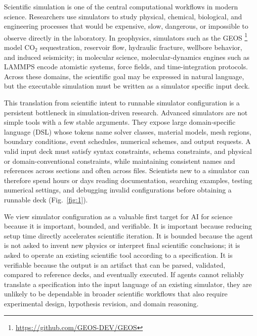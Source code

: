 \documentclass{article}
\begin{document}
Scientific simulation is one of the central computational workflows in modern science. Researchers use simulators to study physical, chemical, biological, and engineering processes that would be expensive, slow, dangerous, or impossible to observe directly in the laboratory. In geophysics, simulators such as the GEOS \footnote{\url{https://github.com/GEOS-DEV/GEOS}}~\citep{geos2024} model CO$_2$ sequestration, reservoir flow, hydraulic fracture, wellbore behavior, and induced seismicity; in molecular science, molecular-dynamics engines such as LAMMPS \citep{holbrook2026lammps} encode atomistic systems, force fields, and time-integration protocols. Across these domains, the scientific goal may be expressed in natural language, but the executable simulation must be written as a simulator specific input deck.

This translation from scientific intent to runnable simulator configuration is a persistent bottleneck in simulation-driven research. Advanced simulators are not simple tools with a few stable arguments. They expose large domain-specific language (DSL) whose tokens name solver classes, material models, mesh regions, boundary conditions, event schedules, numerical schemes, and output requests. A valid input deck must satisfy syntax constraints, schema constraints, and physical or domain-conventional constraints, while maintaining consistent names and references across sections and often across files. Scientists new to a simulator can therefore spend hours or days reading documentation, searching examples, testing numerical settings, and debugging invalid configurations before obtaining a runnable deck (Fig.~\ref{fig:1}).

We view simulator configuration as a valuable first target for AI for science because it is important, bounded, and verifiable. It is important because reducing setup time directly accelerates scientific iteration. It is bounded because the agent is not asked to invent new physics or interpret final scientific conclusions; it is asked to operate an existing scientific tool according to a specification. It is verifiable because the output is an artifact that can be parsed, validated, compared to reference decks, and eventually executed. If agents cannot reliably translate a specification into the input language of an existing simulator, they are unlikely to be dependable in broader scientific workflows that also require experimental design, hypothesis revision, and domain reasoning.
\end{document}
